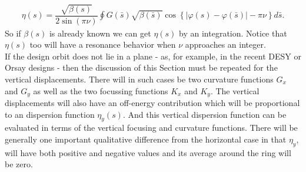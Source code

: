 \begin{align}
	\boxed{ \eta(s) = \dfrac{\sqrt{\beta(s)}}{2\sin{(\pi\nu)}}\oint G(\bar{s})\sqrt{\beta(\bar{s})}\cos\left\lbrace |\varphi(s) - \varphi(\bar{s})| - \pi\nu \right\rbrace d\bar{s}}.
\end{align}
So if $\beta(s)$ is already known we can get $\eta(s)$ by an integration. Notice that $\eta(s)$ too will have a resonance behavior when $\nu$ approaches an integer.\\
If the design orbit does not lie in a plane - as, for example, in the recent DESY or Orsay designs - then the discussion of this Section must be repeated for the vertical displacements. There will in such cases be two curvature functions $G_x$ and $G_y$ as well as the two focussing functions $K_x$ and $K_y$. The vertical displacements will also have an off-energy contribution which will be proportional to an dispersion function $\eta_y(s)$. And this vertical dispersion function can be evaluated in terms of the vertical focusing and curvature functions. There will be generally one important qualitative difference from the horizontal case in that $\eta_y$, will have both positive and negative values and its average around the ring will be zero.
